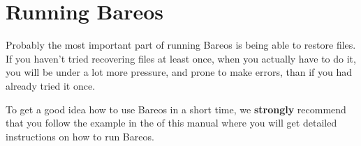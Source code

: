 \label{Running1}

\section{Running Bareos}

Probably the most important part of running Bareos is being able to restore
files. If you haven't tried recovering files at least once, when you actually
have to do it, you will be under a lot more pressure, and prone to make
errors, than if you had already tried it once.

To get a good idea how to use Bareos in a short time, we {\bf strongly}
recommend that you follow the example in the
 of this manual where
you will get detailed instructions on how to run Bareos.




% 
% 
